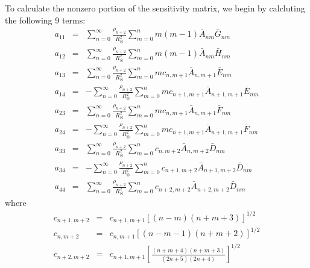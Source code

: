 To calculate the nonzero portion of the sensitivity matrix, we begin
by calcluting the following 9 terms:
%
\begin{eqnarray}
    a_{11} & = & \sum_{n=0}^{\infty}\frac{\rho_{n+2}}{R_\otimes^2}\sum_{m=0}^{n}m(m-1)\bar{A}_{nm}\bar{G}_{nm}\\
    a_{12} & = & \sum_{n=0}^{\infty}\frac{\rho_{n+2}}{R_\otimes^2}\sum_{m=0}^{n}m(m-1)\bar{A}_{nm}\bar{H}_{nm}\\
    a_{13} & = & \sum_{n=0}^{\infty}\frac{\rho_{n+2}}{R_\otimes^2}\sum_{m=0}^{n}mc_{n,m+1}\bar{A}_{n,m+1}\bar{E}_{nm}\\
    a_{14} & = & -\sum_{n=0}^{\infty}\frac{\rho_{n+2}}{R_\otimes^2}\sum_{m=0}^{n}mc_{n+1,m+1}\bar{A}_{n+1,m+1}\bar{E}_{nm}\\
    a_{23} & = & \sum_{n=0}^{\infty}\frac{\rho_{n+2}}{R_\otimes^2}\sum_{m=0}^{n}mc_{n,m+1}\bar{A}_{n,m+1}\bar{F}_{nm}\\
    a_{24} & = & -\sum_{n=0}^{\infty}\frac{\rho_{n+2}}{R_\otimes^2}\sum_{m=0}^{n}mc_{n+1,m+1}\bar{A}_{n+1,m+1}\bar{F}_{nm}\\
    a_{33} & = & \sum_{n=0}^{\infty}\frac{\rho_{n+2}}{R_\otimes^2}\sum_{m=0}^{n}c_{n,m+2}\bar{A}_{n,m+2}\bar{D}_{nm}\\
    a_{34} & = & -\sum_{n=0}^{\infty}\frac{\rho_{n+2}}{R_\otimes^2}\sum_{m=0}^{n}c_{n+1,m+2}\bar{A}_{n+1,m+2}\bar{D}_{nm}\\
    a_{44} & = &
    \sum_{n=0}^{\infty}\frac{\rho_{n+2}}{R_\otimes^2}\sum_{m=0}^{n}c_{n+2,m+2}\bar{A}_{n+2,m+2}\bar{D}_{nm}
\end{eqnarray}
%
where
%
\begin{eqnarray}
    c_{n+1,m+2} &=& c_{n+1,m+1}  \left[(n-m)( n + m + 3)
    \right]^{1/2} \nonumber\\
    c_{n,m+2} &=& c_{n,m+1} \left[( n - m - 1)(n + m +2 )
    \right]^{1/2} \nonumber\\
    c_{n+2,m+2} &=&
    c_{n+1,m+1}\left[\frac{(n+m+4)(n+m+3)}{(2n+5)(2n+4)}\right]^{1/2} \nonumber
\end{eqnarray}

